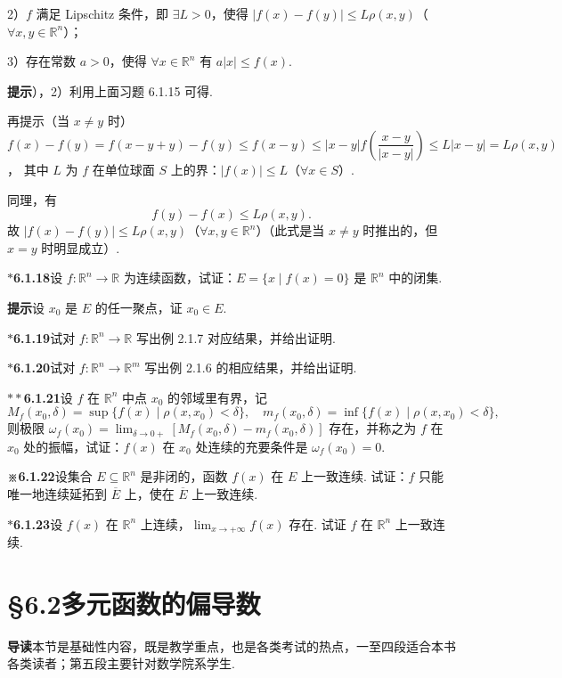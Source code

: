 \documentclass[UTF8,12pt,a4paper,fontset=fandol]{ctexart}
\begin{document}
2）$f$ 满足 Lipschitz 条件，即 $\exists L>0$，使得 $|f(x)-f(y)|\le L\rho(x,y)$（$\forall x,y\in\mathbb{R}^n$）；

3）存在常数 $a>0$，使得 $\forall x\in\mathbb{R}^n$ 有 $a|x|\le f(x)$.

\noindent\textbf{提示}），2）利用上面习题 6.1.15 可得.

再提示\quad （当 $x\ne y$ 时）$f(x)-f(y)=f(x-y+y)-f(y)\le f(x-y)\le |x-y|f\left(\dfrac{x-y}{|x-y|}\right)\le L|x-y|=L\rho(x,y)$，
其中 $L$ 为 $f$ 在单位球面 $S$ 上的界：$|f(x)|\le L$（$\forall x\in S$）.

同理，有
\[
  f(y)-f(x)\le L\rho(x,y).
\]
故 $|f(x)-f(y)|\le L\rho(x,y)$（$\forall x,y\in\mathbb{R}^n$）（此式是当 $x\ne y$ 时推出的，但 $x=y$ 时明显成立）.

\noindent\textbf{$\ast$6.1.18}\quad 设 $f:\mathbb{R}^n\to\mathbb{R}$ 为连续函数，试证：$E=\{x\mid f(x)=0\}$ 是 $\mathbb{R}^n$ 中的闭集.

\noindent\textbf{提示}\quad 设 $x_0$ 是 $E$ 的任一聚点，证 $x_0\in E$.

\noindent\textbf{$\ast$6.1.19}\quad 试对 $f:\mathbb{R}^n\to\mathbb{R}$ 写出例 2.1.7 对应结果，并给出证明.

\noindent\textbf{$\ast$6.1.20}\quad 试对 $f:\mathbb{R}^n\to\mathbb{R}^m$ 写出例 2.1.6 的相应结果，并给出证明.

\noindent\textbf{$\ast\ast$6.1.21}\quad 设 $f$ 在 $\mathbb{R}^n$ 中点 $x_0$ 的邻域里有界，记
\[
  M_f(x_0,\delta)=\sup\{f(x)\mid \rho(x,x_0)<\delta\},\quad
  m_f(x_0,\delta)=\inf\{f(x)\mid \rho(x,x_0)<\delta\},
\]
则极限 $\omega_f(x_0)=\lim_{\delta\to0+}[M_f(x_0,\delta)-m_f(x_0,\delta)]$ 存在，并称之为 $f$ 在 $x_0$ 处的振幅，试证：$f(x)$ 在 $x_0$ 处连续的充要条件是 $\omega_f(x_0)=0$.

\noindent\textbf{※6.1.22}\quad 设集合 $E\subseteq\mathbb{R}^n$ 是非闭的，函数 $f(x)$ 在 $E$ 上一致连续. 试证：$f$ 只能唯一地连续延拓到 $\overline E$ 上，使在 $\overline E$ 上一致连续.

\noindent\textbf{$\ast$6.1.23}\quad 设 $f(x)$ 在 $\mathbb{R}^n$ 上连续，$\lim_{x\to+\infty}f(x)$ 存在. 试证 $f$ 在 $\mathbb{R}^n$ 上一致连续.

\section*{§6.2\quad 多元函数的偏导数}

\noindent\textbf{导读}\quad 本节是基础性内容，既是教学重点，也是各类考试的热点，一至四段适合本书各类读者；第五段主要针对数学院系学生.
\end{document}
